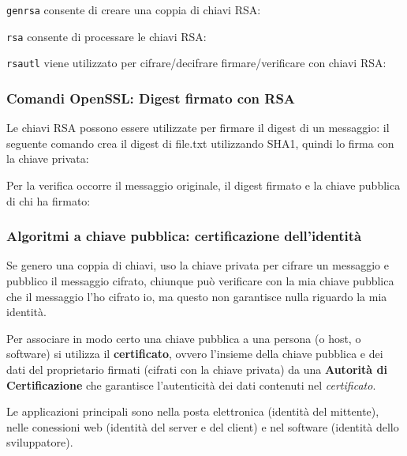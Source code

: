             \verb|genrsa| consente di creare una coppia di chiavi RSA:

            

            \verb|rsa| consente di processare le chiavi RSA:

            

            \verb|rsautl| viene utilizzato per cifrare/decifrare firmare/verificare con chiavi RSA:

            
            
        \subsubsection{Comandi OpenSSL: Digest firmato con RSA}
            Le chiavi RSA possono essere utilizzate per firmare il digest di un messaggio: il seguente comando crea il digest di file.txt utilizzando SHA1, quindi lo firma con la chiave privata:

            

            Per la verifica occorre il messaggio originale, il digest firmato e la chiave pubblica di chi ha firmato:

            

        \subsubsection{Algoritmi a chiave pubblica: certificazione dell'identità}
            Se genero una coppia di chiavi, uso la chiave privata per cifrare un messaggio e pubblico il messaggio cifrato, chiunque può verificare con la mia chiave pubblica che il messaggio l'ho cifrato io, ma questo non garantisce nulla riguardo la mia identità.

            Per associare in modo certo una chiave pubblica a una persona (o host, o software) si utilizza il \textbf{certificato}, ovvero l'insieme della chiave pubblica e dei dati del proprietario firmati (cifrati con la chiave privata) da una \textbf{Autorità di Certificazione} che garantisce l'autenticità dei dati contenuti nel \textit{certificato}.

            Le applicazioni principali sono nella posta elettronica (identità del mittente), nelle conessioni web (identità del server e del client) e nel software (identità dello sviluppatore).

